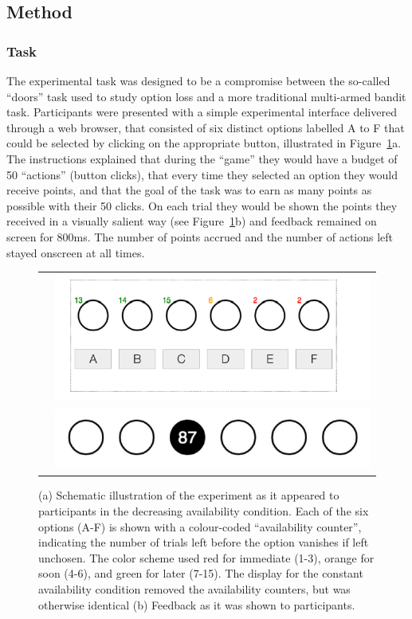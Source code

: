 \documentclass[a4paper,doc,natbib]{apa6}
\begin{document}
\subsection{Method}

\subsubsection{Task}

The experimental task was designed to be a compromise between the so-called ``doors'' task used to study option loss \citep{shin2004keeping} and a more traditional multi-armed bandit task. Participants were presented with a simple experimental interface delivered through a web browser, that consisted of six distinct options labelled A to F that could be selected by clicking on the appropriate button, illustrated in Figure~\ref{fig:task}a. The instructions explained that during the ``game'' they would have a budget of 50 ``actions'' (button clicks), that every time they selected an option they would receive points, and that the goal of the task was to earn as many points as possible with their 50 clicks. On each trial they would be shown the points they received in a visually salient way (see Figure~\ref{fig:task}b) and feedback remained on screen for 800ms. The  number of points accrued and the number of actions left stayed onscreen at all times.

\begin{figure}[t]
\centering
\begin{tabular}{cc}
\raisebox{3cm}{(a)} & \includegraphics[width=.6\textwidth]{availability.png} \\
\raisebox{1.5cm}{(b)} & \includegraphics[width=.55\textwidth]{points.png}
\end{tabular}
\caption{\small{(a) Schematic illustration of the experiment as it appeared to participants in the decreasing availability condition. Each of the six options (A-F) is shown with a colour-coded ``availability counter'', indicating the number of trials left before the option vanishes if left unchosen. The color scheme used red for immediate (1-3), orange for soon (4-6), and green for later (7-15). The display for the constant availability condition removed the availability counters, but was otherwise identical (b) Feedback as it was shown to participants.}}
\label{fig:task}
\end{figure}
\end{document}
